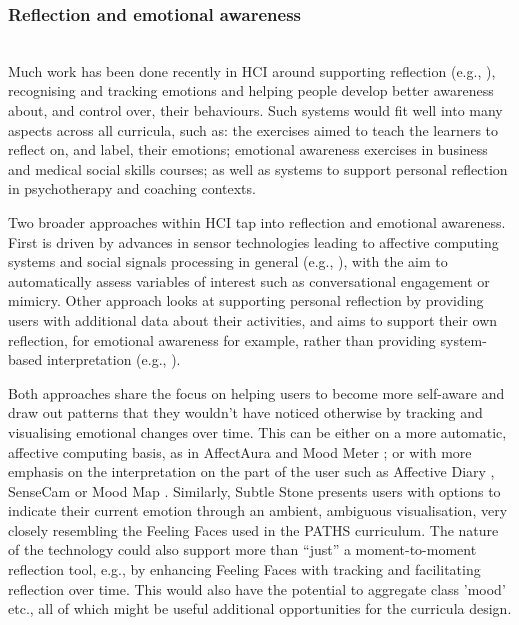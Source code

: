 \documentclass[prodmode,acmtochi]{acmsmall}
\begin{document}
  

        \subsubsection{Reflection and emotional awareness}~\\
        \label{sec:emaware}
Much work has been done recently in HCI around supporting reflection  (e.g., \cite{Fleck2010,Sas2011}), recognising and tracking emotions and helping people develop better awareness about, and control over, their behaviours. Such systems would fit well into many aspects across all curricula, such as: the exercises aimed to teach the learners to reflect on, and label, their emotions; emotional awareness exercises in business and medical social skills courses; as well as systems to support personal reflection in psychotherapy and coaching contexts. 
         
Two broader approaches within HCI tap into reflection and emotional awareness. First is driven by advances in sensor technologies leading to affective computing systems and social signals processing in general (e.g., \cite{Sun2011,Pentland2008}), with the aim to automatically assess variables of interest such as conversational engagement or mimicry.  Other approach looks at supporting personal reflection by providing users with additional data about their activities, and aims to support their own reflection, for emotional awareness for example, rather than providing system-based interpretation (e.g., \cite{Kalnikaite2010,Hook2008,Slovak2012}). 

Both approaches share the focus on helping users to become more self-aware and draw out patterns that they wouldn't have noticed otherwise by tracking and visualising emotional changes over time. This can be either on a more automatic, affective computing basis, as in AffectAura \cite{McDuff2012} and Mood Meter \cite{Hernandez2012}; or with more emphasis on the interpretation on the part of the user such as Affective Diary \cite{Stahl2008,Sengers2007,Hook2008}, SenseCam \cite{Kalnikaite2010,Fleck2009} or Mood Map \cite{Morris2010}. 
%
Similarly, Subtle Stone \cite{Balaam2010} presents users with options to indicate their current emotion through an ambient, ambiguous visualisation, very closely resembling the Feeling Faces used in the PATHS curriculum. The nature of the technology could also support more than ``just'' a moment-to-moment reflection tool, e.g., by enhancing Feeling Faces with tracking and facilitating reflection over time. This would also have the potential to aggregate class 'mood'  etc., all of which might be useful additional opportunities for the curricula design. 
%
\end{document}

